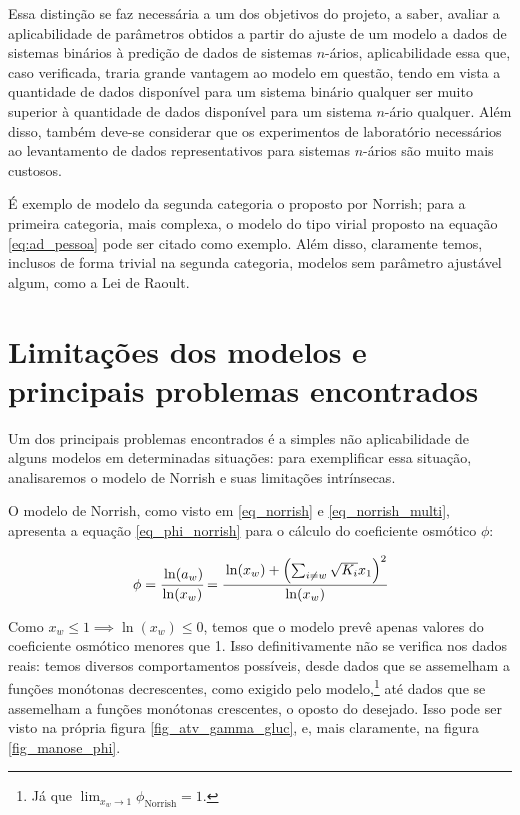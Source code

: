 \documentclass[
	12pt,				%
	openright,
	twoside,
	a4paper,			%
	english,			%
	french,				%
	brazil				%
	]{abntex2}
\begin{document}
Essa distinção se faz necessária a um dos objetivos do projeto, a saber, avaliar
a aplicabilidade de parâmetros obtidos a partir do ajuste de um modelo a dados
de sistemas binários à predição de dados de sistemas $n$-ários, aplicabilidade
essa que, caso verificada, traria grande vantagem ao modelo em questão, tendo em
vista a quantidade de dados disponível para um sistema binário qualquer
ser muito superior à quantidade de dados disponível para um sistema $n$-ário
qualquer. Além disso, também deve-se considerar que os experimentos de
laboratório necessários ao levantamento de dados representativos para sistemas
$n$-ários são muito mais custosos.

É exemplo de modelo da segunda categoria o proposto por Norrish; para a
primeira categoria, mais complexa, o modelo do tipo virial proposto na equação
\ref{eq:ad_pessoa} pode ser citado como exemplo. Além disso, claramente temos,
inclusos de forma trivial na segunda categoria, modelos sem parâmetro ajustável
algum, como a Lei de Raoult.

\section{Limitações dos modelos e principais problemas encontrados}

Um dos principais problemas encontrados é a simples não aplicabilidade de
alguns modelos em determinadas situações: para exemplificar essa situação,
analisaremos o modelo de Norrish e suas limitações intrínsecas.

O modelo de Norrish, como visto em \ref{eq_norrish} e \ref{eq_norrish_multi},
apresenta a equação \ref{eq_phi_norrish} para o cálculo do coeficiente
osmótico $\phi$:

\begin{equation}
	\label{eq_phi_norrish}
	\phi = \cfrac{\ln(a_w)}{\ln(x_w)} = \cfrac{\ln(x_w) + \left(\sum_{ i\neq w}
	\sqrt{K_i}x_1\right)^2}{\ln(x_w)}
\end{equation}

Como $x_w \le 1 \implies \ln(x_w) \le 0$, temos que o modelo prevê apenas
valores do coeficiente osmótico menores que 1. Isso definitivamente não se
verifica nos dados reais: temos diversos comportamentos possíveis, desde
dados que se assemelham a funções monótonas decrescentes, como exigido pelo
modelo,\footnote{%
	Já que $\lim_{x_w \to 1}\phi_\text{Norrish} = 1$.
} até dados que se assemelham a funções monótonas crescentes, o oposto do
desejado. Isso pode ser visto na própria figura \ref{fig_atv_gamma_gluc}, e,
mais claramente, na figura \ref{fig_manose_phi}.
\end{document}

